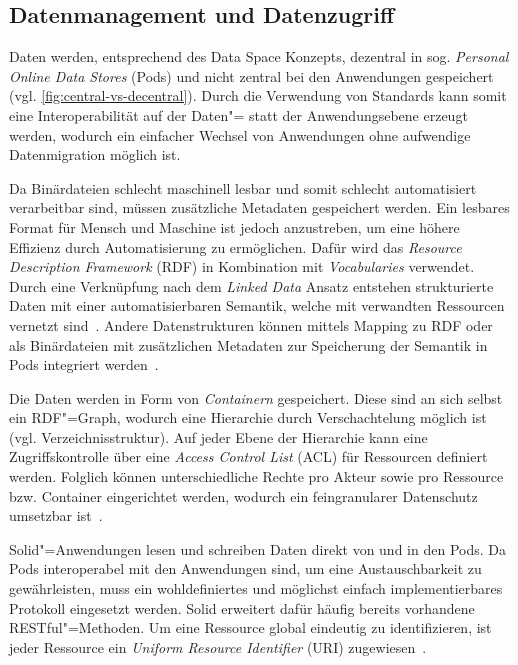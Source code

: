 \subsection{Datenmanagement und Datenzugriff}

Daten werden, entsprechend des Data Space Konzepts, dezentral in sog. \emph{Personal Online Data Stores} (Pods) und nicht zentral bei den Anwendungen gespeichert~\cite{mecklerWebLinkedData2023} (vgl. \autoref{fig:central-vs-decentral}).
Durch die Verwendung von Standards kann somit eine Interoperabilität auf der Daten"= statt der Anwendungsebene erzeugt werden, wodurch ein einfacher Wechsel von Anwendungen ohne aufwendige Datenmigration möglich ist.

Da Binärdateien schlecht maschinell lesbar und somit schlecht automatisiert verarbeitbar sind, müssen zusätzliche Metadaten gespeichert werden.
Ein lesbares Format für Mensch und Maschine ist jedoch anzustreben, um eine höhere Effizienz durch Automatisierung zu ermöglichen.
Dafür wird das \emph{Resource Description Framework} (RDF) in Kombination mit \emph{Vocabularies} verwendet.
Durch eine Verknüpfung nach dem \emph{Linked Data} Ansatz entstehen strukturierte Daten mit einer automatisierbaren Semantik, welche mit verwandten Ressourcen vernetzt sind~\cite{bizerLinkedDataStory2009,mecklerWebLinkedData2023,sambraSolidPlatformDecentralized2016}.
Andere Datenstrukturen können mittels Mapping zu RDF oder als Binärdateien mit zusätzlichen Metadaten zur Speicherung der Semantik in Pods integriert werden~\cite{mecklerWebLinkedData2023,sambraSolidPlatformDecentralized2016}.

Die Daten werden in Form von \emph{Containern} gespeichert.
Diese sind an sich selbst ein RDF"=Graph, wodurch eine Hierarchie durch Verschachtelung möglich ist (vgl. Verzeichnisstruktur).
Auf jeder Ebene der Hierarchie kann eine Zugriffskontrolle über eine \emph{Access Control List} (ACL) für Ressourcen definiert werden.
Folglich können unterschiedliche Rechte pro Akteur sowie pro Ressource bzw. Container eingerichtet werden, wodurch ein feingranularer Datenschutz umsetzbar ist~\cite{mecklerWebLinkedData2023,sambraSolidPlatformDecentralized2016}.

Solid"=Anwendungen lesen und schreiben Daten direkt von und in den Pods.
Da Pods interoperabel mit den Anwendungen sind, um eine Austauschbarkeit zu gewährleisten, muss ein wohldefiniertes und möglichst einfach implementierbares Protokoll eingesetzt werden.
Solid erweitert dafür häufig bereits vorhandene RESTful"=Methoden.
Um eine Ressource global eindeutig zu identifizieren, ist jeder Ressource ein \emph{Uniform Resource Identifier} (URI) zugewiesen~\cite{mecklerWebLinkedData2023,sambraSolidPlatformDecentralized2016}.

